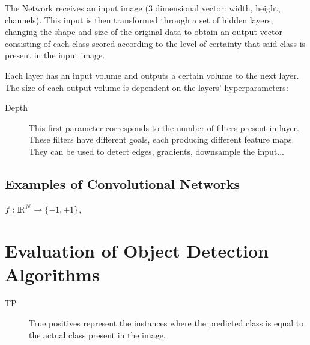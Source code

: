 The Network receives an input image (3 dimensional vector: width, height, channels). This input is then transformed through a set of hidden layers, changing the shape and size of the original data to obtain an output vector consisting of each class scored according to the level of certainty that said class is present in the input image.  




Each layer has an input volume and outputs a certain volume to the next layer. The size of each output volume is dependent on the layers' hyperparameters:


\begin{description}

 \item[Depth] This first parameter corresponds to the number of filters present in layer. These filters have different goals, each producing different feature maps. They can be used to detect edges, gradients, downsample the input... 


 
\end{description}


\subsection{Examples of Convolutional Networks}

$ f: {\rm I\!R}^{N} \rightarrow \{-1,+1\}$, 

\section{Evaluation of Object Detection Algorithms}

\begin{description}

 \item[\ac{TP}] True positives represent the instances where the predicted class is equal to the actual class present in the image.

\end{description}

